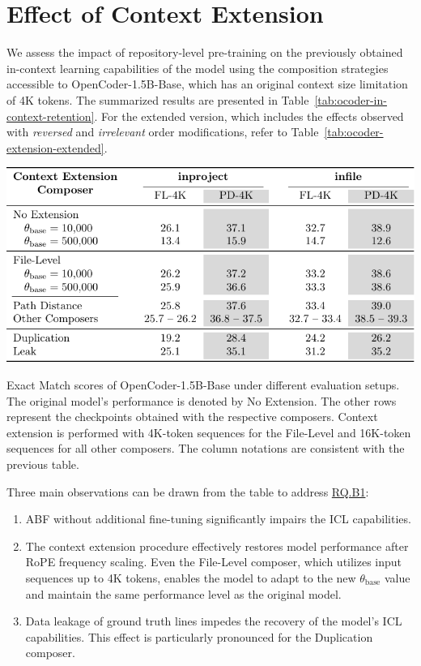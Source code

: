 \section{Effect of Context Extension}\label{sec:effect-of-context-extension}

We assess the impact of repository-level pre-training on the previously obtained in-context learning capabilities of the model using the composition strategies accessible to OpenCoder-1.5B-Base, which has an original context size limitation of 4K tokens. The summarized results are presented in Table~\ref{tab:ocoder-in-context-retention}. For the extended version, which includes the effects observed with \textit{reversed} and \textit{irrelevant} order modifications, refer to Table~\ref{tab:ocoder-extension-extended}.

\begin{table}[htbp]
    \centering
    \includegraphics[width=\textwidth]{tables/rq-b1.pdf}
    \caption{Exact Match scores of OpenCoder-1.5B-Base under different evaluation setups. The original model's performance is denoted by No Extension. The other rows represent the checkpoints obtained with the respective composers. Context extension is performed with 4K-token sequences for the File-Level and 16K-token sequences for all other composers. The column notations are consistent with the previous table.}\label{tab:ocoder-in-context-retention}
\end{table}

Three main observations can be drawn from the table to address \hyperref[rq:rq-b1]{RQ.B1}:

\begin{enumerate}
\item ABF without additional fine-tuning significantly impairs the ICL capabilities.
\item The context extension procedure effectively restores model performance after RoPE frequency scaling. Even the File-Level composer, which utilizes input sequences up to 4K tokens, enables the model to adapt to the new \(\theta_{\mathrm{base}}\) value and maintain the same performance level as the original model.
\item Data leakage of ground truth lines impedes the recovery of the model's ICL capabilities. This effect is particularly pronounced for the Duplication composer.
\end{enumerate}

